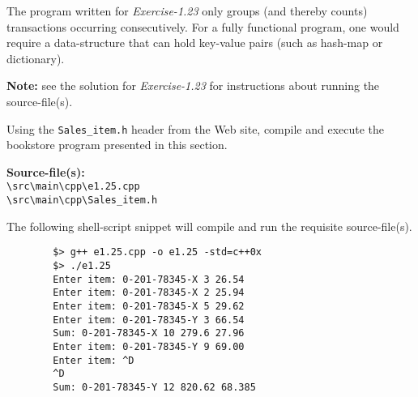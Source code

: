 \documentclass[12pt, a4paper]{article}
\begin{document}
    \noindent The program written for \textit{Exercise-1.23} only groups (and thereby counts) transactions occurring consecutively.
    For a fully functional program, one would require a data-structure that can hold key-value pairs (such as hash-map or dictionary).

    \noindent\textbf{Note:} see the solution for \textit{Exercise-1.23} for instructions about running the source-file(s).

    \bigskip
    \begin{tcolorbox}[title={Exercise: 1.25}]
        Using the \texttt{Sales\_item.h} header from the Web site, compile and execute the bookstore program presented in this section.
    \end{tcolorbox}
    \noindent\textbf{Source-file(s):}
    \\ \texttt{\textbackslash src\textbackslash main\textbackslash cpp\textbackslash e1.25.cpp}
    \\ \texttt{\textbackslash src\textbackslash main\textbackslash cpp\textbackslash Sales\_item.h}

    \noindent The following shell-script snippet will compile and run the requisite source-file(s).
    \begin{verbatim}
        $> g++ e1.25.cpp -o e1.25 -std=c++0x
        $> ./e1.25
        Enter item: 0-201-78345-X 3 26.54
        Enter item: 0-201-78345-X 2 25.94
        Enter item: 0-201-78345-X 5 29.62
        Enter item: 0-201-78345-Y 3 66.54
        Sum: 0-201-78345-X 10 279.6 27.96
        Enter item: 0-201-78345-Y 9 69.00
        Enter item: ^D
        ^D
        Sum: 0-201-78345-Y 12 820.62 68.385
    \end{verbatim}

    \pagebreak
    \printbibliography
\end{document}
